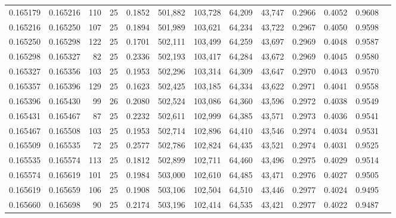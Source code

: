 \begin{tabular}{rrrrrrrrrrrrr}
0.165179 & 0.165216 &   110 &  25 &                                     0.1852 & 501,882 & 103,728 &  64,209 &  43,747 & 0.2966 & 0.4052 & 0.9608 \\
0.165216 & 0.165250 &   107 &  25 &                                     0.1894 & 501,989 & 103,621 &  64,234 &  43,722 & 0.2967 & 0.4050 & 0.9598 \\
0.165250 & 0.165298 &   122 &  25 &                                     0.1701 & 502,111 & 103,499 &  64,259 &  43,697 & 0.2969 & 0.4048 & 0.9587 \\
0.165298 & 0.165327 &    82 &  25 &                                     0.2336 & 502,193 & 103,417 &  64,284 &  43,672 & 0.2969 & 0.4045 & 0.9580 \\
0.165327 & 0.165356 &   103 &  25 &                                     0.1953 & 502,296 & 103,314 &  64,309 &  43,647 & 0.2970 & 0.4043 & 0.9570 \\
0.165357 & 0.165396 &   129 &  25 &                                     0.1623 & 502,425 & 103,185 &  64,334 &  43,622 & 0.2971 & 0.4041 & 0.9558 \\
0.165396 & 0.165430 &    99 &  26 &                                     0.2080 & 502,524 & 103,086 &  64,360 &  43,596 & 0.2972 & 0.4038 & 0.9549 \\
0.165431 & 0.165467 &    87 &  25 &                                     0.2232 & 502,611 & 102,999 &  64,385 &  43,571 & 0.2973 & 0.4036 & 0.9541 \\
0.165467 & 0.165508 &   103 &  25 &                                     0.1953 & 502,714 & 102,896 &  64,410 &  43,546 & 0.2974 & 0.4034 & 0.9531 \\
0.165509 & 0.165535 &    72 &  25 &                                     0.2577 & 502,786 & 102,824 &  64,435 &  43,521 & 0.2974 & 0.4031 & 0.9525 \\
0.165535 & 0.165574 &   113 &  25 &                                     0.1812 & 502,899 & 102,711 &  64,460 &  43,496 & 0.2975 & 0.4029 & 0.9514 \\
0.165574 & 0.165619 &   101 &  25 &                                     0.1984 & 503,000 & 102,610 &  64,485 &  43,471 & 0.2976 & 0.4027 & 0.9505 \\
0.165619 & 0.165659 &   106 &  25 &                                     0.1908 & 503,106 & 102,504 &  64,510 &  43,446 & 0.2977 & 0.4024 & 0.9495 \\
0.165660 & 0.165698 &    90 &  25 &                                     0.2174 & 503,196 & 102,414 &  64,535 &  43,421 & 0.2977 & 0.4022 & 0.9487 \\

\end{tabular}
